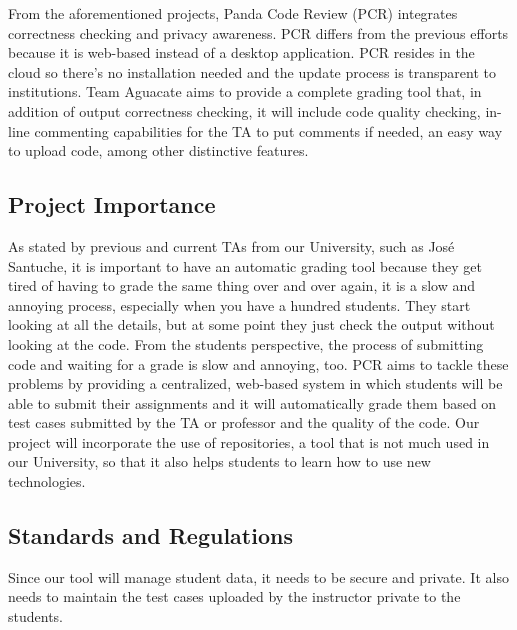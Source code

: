 From the aforementioned projects, Panda Code Review (PCR) integrates correctness checking and privacy awareness. PCR differs from the previous efforts because it is web-based instead of a desktop application. PCR resides in the cloud so there's no installation needed and the update process is transparent to institutions. Team Aguacate aims to provide a complete grading tool that, in addition of output correctness checking, it will include code quality checking, in-line commenting capabilities for the TA to put comments if needed, an easy way to upload code, among other distinctive features.

\subsection{Project Importance}

As stated by previous and current TAs from our University, such as José Santuche, it is important to have an automatic grading tool because they get tired of having to grade the same thing over and over again, it is a slow and annoying process, especially when you have a hundred students. They start looking at all the details, but at some point they just check the output without looking at the code. From the students perspective, the process of submitting code and waiting for a grade is slow and annoying, too. PCR aims to tackle these problems by providing a centralized, web-based system in which students will be able to submit their assignments and it will automatically grade them based on test cases submitted by the TA or professor and the quality of the code. Our project will incorporate the use of repositories, a tool that is not much used in our University, so that it also helps students to learn how to use new technologies.

\subsection{Standards and Regulations}

Since our tool will manage student data, it needs to be secure and private. It also needs to maintain the test cases uploaded by the instructor private to the students.

